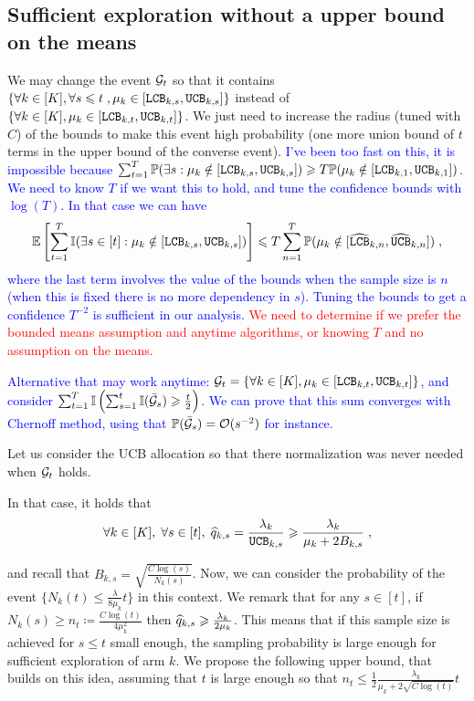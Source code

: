 \subsection{Sufficient exploration without a upper bound on the means}

We may change the event $\mathcal{G}_t$ so that it contains $\{\forall k \in [K],\forall s \leqslant t\;, \mu_k \in [\texttt{LCB}_{k,s}, \texttt{UCB}_{k,s}] \}$ instead of $\{\forall k \in [K], \mu_k \in [\texttt{LCB}_{k,t}, \texttt{UCB}_{k,t}] \}$. We just need to increase the radius (tuned with $C$) of the bounds to make this event high probability (one more union bound of $t$ terms in the upper bound of the converse event).
\textcolor{blue}{I've been too fast on this, it is impossible because $\sum_{t=1}^T \mathbb{P}(\exists s: \mu_k \notin [\texttt{LCB}_{k,s}, \texttt{UCB}_{k,s}])\geqslant T \mathbb{P}(\mu_k \notin [\texttt{LCB}_{k,1}, \texttt{UCB}_{k,1}])$. We need  to know $T$ if we want this to hold, and tune the confidence bounds with $\log(T)$. In that case we can have
\[\mathbb{E}\left[\sum_{t=1}^T \mathbb{I}(\exists s\in [t]: \mu_k \notin [\texttt{LCB}_{k,s}, \texttt{UCB}_{k,s}]) \right] \leqslant T \sum_{n=1}^T \mathbb{P}(\mu_k \notin [\widehat{\texttt{LCB}}_{k,n}, \widehat{\texttt{UCB}}_{k,n}])\;, \]
where the last term involves the value of the bounds when the sample size is $n$ (when this is fixed there is no more dependency in $s$). Tuning the bounds to get a confidence $T^{-2}$ is sufficient in our analysis.
}
\textcolor{red}{We need to determine if we prefer the bounded means assumption and anytime algorithms, or knowing $T$ and no assumption on the means.}

\textcolor{blue}{Alternative that may work anytime: $\mathcal{G}_t=\{\forall k \in [K], \mu_k \in [\texttt{LCB}_{k,t}, \texttt{UCB}_{k,t}] \}$, and consider $\sum_{t=1}^T\mathbb{I}\left(\sum_{s=1}^t \mathbb{I}(\bar {\mathcal{G}}_s) \geqslant \frac{t}{2} \right)$. We can prove that this sum converges with Chernoff method, using that $\mathbb{P}(\bar {\mathcal{G}}_s)=\mathcal{O}(s^{-2})$ for instance.}

Let us consider the UCB allocation so that there normalization was never needed when $\mathcal{G}_t$ holds.

In that case, it holds that \[\forall k \in [K],\;\forall s \in [t],\; \widehat{q}_{k,s} = \frac{\lambda_k}{\texttt{UCB}_{k,s}} \geqslant \frac{\lambda_k}{\mu_k + 2 B_{k, s}} \;, \]

and recall that $B_{k,s}=\sqrt{\frac{C\log(s)}{N_k(s)}}$. Now, we can consider the probability of the event $\{N_k(t)\leq \frac{\lambda}{8\mu_k}t \}$ in this context. We remark that for any $s\in [t]$, if $N_k(s) \geq n_t \coloneqq \frac{C\log(t)}{4\mu_k^2}$ then $\widehat{q}_{k,s}\geqslant \frac{\lambda_k}{2\mu_k}$. This means that if this sample size is achieved for $s\leq t$ small enough, the sampling probability is large enough for sufficient exploration of arm $k$. We propose the following upper bound, that builds on this idea, assuming that $t$ is large enough so that $n_t\leq  \frac{1}{2}\frac{\lambda_k}{\mu_k + 2\sqrt{C\log(t)}}t$

